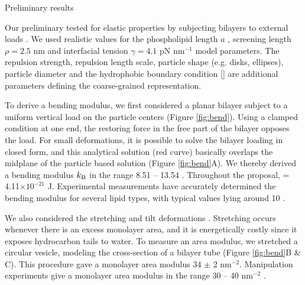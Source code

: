 

\begin{center}
Preliminary results
\end{center}
Our preliminary tested for elastic properties by subjecting bilayers to external loads \cite{Fu19}.
We used realistic values for the phospholipid length $a$ \cite{Boal},
screening length $\rho = 2.5$ nm \cite{Eriksson1989,Lin2005,Parsegian,Israelachvili80,TerziDeserno17}
and  interfacial tension $\gamma=4.1$ pN nm$^{-1}$  \cite{GarciaSaez, KUZMIN2005, Petelska2012, Jackson}
model parameters.
The repulsion strength, repulsion length scale, particle shape (e.g. disks, ellipses), particle diameter and the hydrophobic boundary condition \eqref{}
are additional parameters defining the coarse-grained representation. 

To derive a bending modulus, we first considered a planar bilayer subject to a uniform vertical load on the particle centers (Figure \ref{fig:bend}). 
Using a clamped condition at one end, the restoring force in the free part of the bilayer opposes the load.
For small deformations, it is possible to solve the bilayer loading in closed form, and 
this analytical solution (red curve) basically overlaps the midplane of the particle based solution (Figure \ref{fig:bend}A).
We thereby derived a bending modulus $k_{\mathrm{B}}$ in the range 8.51 -- 13.54 \kBT. Throughout the proposal, \kBT\; = 4.11$\times 10^{-21}$ J.
Experimental measurements have accurately determined the bending modulus for several lipid types, with 
typical values lying around 10 \kBT\; \cite{Naetal15,VeBrPa15,NAGLE2000159,PhysRevLett.113.248102}.

We also considered the stretching and tilt deformations \cite{Fu19}. 
Stretching occurs whenever there is an excess monolayer area,
and it is energetically costly since it exposes hydrocarbon tails to water.
To measure an area modulus, we stretched a circular vesicle, modeling the cross-section 
of a bilayer tube (Figure \ref{fig:bend}B \& C).
This procedure gave a monolayer area modulus 
34 $\pm$ 2 \kBT \;nm$^{-2}$. Manipulation experiments give a monolayer area modulus in the range 
30 -- 40 \kBT\; nm$^{-2}$ \cite{Nagle17, Nagle17-2}. 

